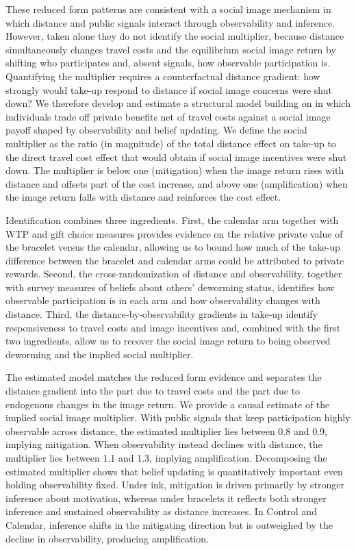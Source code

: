 \documentclass[12pt,a4paper]{article}
\begin{document}
These reduced form patterns are consistent with a social image mechanism in which distance and public signals interact through observability and inference. However, taken alone they do not identify the social multiplier, because distance simultaneously changes travel costs and the equilibrium social image return by shifting who participates and, absent signals, how observable participation is. Quantifying the multiplier requires a counterfactual distance gradient: how strongly would take-up respond to distance if social image concerns were shut down? We therefore develop and estimate a structural model building on \citet{Benabou_laws_2011} in which individuals trade off private benefits net of travel costs against a social image payoff shaped by observability and belief updating. We define the social multiplier as the ratio (in magnitude) of the total distance effect on take-up to the direct travel cost effect that would obtain if social image incentives were shut down. The multiplier is below one (mitigation) when the image return rises with distance and offsets part of the cost increase, and above one (amplification) when the image return falls with distance and reinforces the cost effect. 

Identification combines three ingredients. First, the calendar arm together with WTP and gift choice measures provides evidence on the relative private value of the bracelet versus the calendar, allowing us to bound how much of the take-up difference between the bracelet and calendar arms could be attributed to private rewards. Second, the cross‑randomization of distance and observability, together with survey measures of beliefs about others’ deworming status, identifies how observable participation is in each arm and how observability changes with distance. Third, the distance‑by‑observability gradients in take‑up identify responsiveness to travel costs and image incentives and, combined with the first two ingredients, allow us to recover the social image return to being observed deworming and the implied social multiplier. 

The estimated model matches the reduced form evidence and separates the distance gradient into the part due to travel costs and the part due to endogenous changes in the image return. We provide a causal estimate of the implied social image multiplier. With public signals that keep participation highly observable across distance, the estimated multiplier lies between 0.8 and 0.9, implying mitigation. When observability instead declines with distance, the multiplier lies between 1.1 and 1.3, implying amplification. Decomposing the estimated multiplier shows that belief updating is quantitatively important even holding observability fixed. Under ink, mitigation is driven primarily by stronger inference about motivation, whereas under bracelets it reflects both stronger inference and sustained observability as distance increases. In Control and Calendar, inference shifts in the mitigating direction but is outweighed by the decline in observability, producing amplification.
\end{document}
